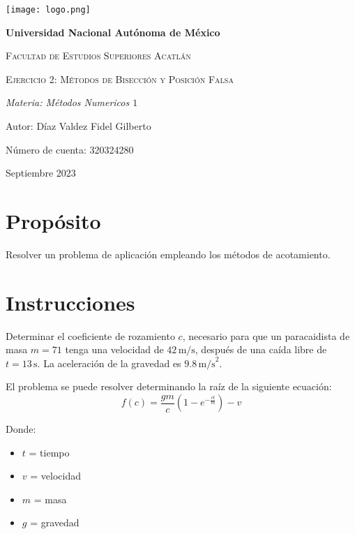 \documentclass{article}
\begin{document}
    \begin{titlepage}
        
        \centering
        {\texttt{[image: logo.png]}\par}
        \vspace{1cm}
        {\bfseries\LARGE Universidad Nacional Autónoma de México \par}
        \vspace{1cm}
        {\scshape\Large Facultad de Estudios Superiores Acatlán \par}
        \vspace{3cm}
        {\scshape\Huge Ejercicio 2: Métodos de Bisección y Posición Falsa \par}
        \vspace{3cm}
        {\itshape\Large Materia: Métodos Numericos $1$ \par}
        \vfill
        {\Large Autor: Díaz Valdez Fidel Gilberto \par}
        {\Large Número de cuenta: 320324280 \par}
        \vfill
        {\Large Septiembre 2023 \par}
    \end{titlepage}


\section{Propósito}
Resolver un problema de aplicación empleando los métodos de acotamiento.

\section{Instrucciones}
Determinar el coeficiente de rozamiento \(c\), necesario para que un paracaidista de masa \(m = 71\) tenga una velocidad de \(42 \, \text{m/s}\), después de una caída libre de \(t = 13 \, \text{s}\). La aceleración de la gravedad es \(9.8 \, \text{m/s}^2\).

El problema se puede resolver determinando la raíz de la siguiente ecuación:
\[f(c) = \frac{gm}{c}\left(1 - e^{-\frac{ct}{m}}\right) - v\]

Donde:
\begin{itemize}
    \item \(t\) = tiempo
    \item \(v\) = velocidad
    \item \(m\) = masa
    \item \(g\) = gravedad
\end{itemize}
\end{document}
